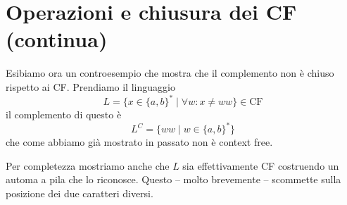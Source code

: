 \documentclass[12pt]{article}
\begin{document}
\tableofcontents
\newpage
\section{Operazioni e chiusura dei CF (continua)}
\begin{tcolorbox}[breakable]
	Esibiamo ora un controesempio che mostra che il complemento non è chiuso rispetto ai CF.
	Prendiamo il linguaggio
	$$ L = \{ x \in \{a, b\}^* \mid \forall w : x \neq w w \} \in \text{CF} $$
	il complemento di questo è
	$$ L^C = \{ w w \mid w \in \{a, b\}^* \} $$
	che come abbiamo già mostrato in passato non è context free.	%

	Per completezza mostriamo anche che $L$ sia effettivamente CF costruendo un automa a pila che lo riconosce.
	Questo -- molto brevemente -- scommette sulla posizione dei due caratteri diversi.
	\begin{center}
\end{center}
\end{tcolorbox}
\end{document}
